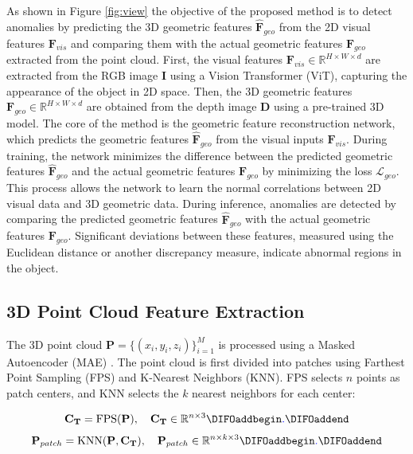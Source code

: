As shown in Figure \ref{fig:view} the objective of the proposed method is to detect anomalies by predicting the 3D geometric features $\hat{\mathbf{F}}_{geo}$ from the 2D visual features $\mathbf{F}_{vis}$ and comparing them with the actual geometric features $\mathbf{F}_{geo}$ extracted from the point cloud. First, the visual features $\mathbf{F}_{vis} \in \mathbb{R}^{H \times W \times d}$ are extracted from the RGB image $\mathbf{I}$ using a Vision Transformer (ViT), capturing the appearance of the object in 2D space. Then, the 3D geometric features $\mathbf{F}_{geo} \in \mathbb{R}^{H \times W \times d}$ are obtained from the depth image $\mathbf{D}$ using a pre-trained 3D model. The core of the method is the geometric feature reconstruction network, which predicts the geometric features $\hat{\mathbf{F}}_{geo}$ from the visual inputs $\mathbf{F}_{vis}$. During training, the network minimizes the difference between the predicted geometric features $\hat{\mathbf{F}}_{geo}$ and the actual geometric features $\mathbf{F}_{geo}$ by minimizing the loss $\mathcal{L}_{geo}$. This process allows the network to learn the normal correlations between 2D visual data and 3D geometric data. During inference, anomalies are detected by comparing the predicted geometric features $\hat{\mathbf{F}}_{geo}$ with the actual geometric features $\mathbf{F}_{geo}$. Significant deviations between these features, measured using the Euclidean distance or another discrepancy measure, indicate abnormal regions in the object.

\subsection*{3D Point Cloud Feature Extraction}

The 3D point cloud $\mathbf{P} = \{(x_i, y_i, z_i)\}_{i=1}^{M}$ is processed using a Masked Autoencoder (MAE) \cite{pang2022masked}. The point cloud is first divided into patches using Farthest Point Sampling (FPS) and K-Nearest Neighbors (KNN). FPS selects $n$ points as patch centers, and KNN selects the $k$ nearest neighbors for each center:

\begin{equation}
    \mathbf{C_T} = \text{FPS}(\mathbf{P}), \quad \mathbf{C_T} \in \mathbb{R}^{n \times 3}\DIFaddbegin \DIFadd{.
}\DIFaddend \end{equation}
\begin{equation}
    \mathbf{P}_{patch} = \text{KNN}(\mathbf{P}, \mathbf{C_T}), \quad \mathbf{P}_{patch} \in \mathbb{R}^{n \times k \times 3}\DIFaddbegin \DIFadd{.
}\DIFaddend \end{equation}

